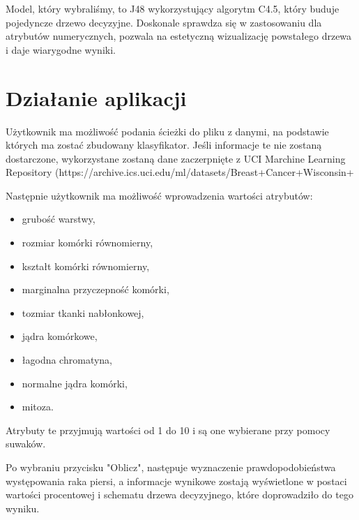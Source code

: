 \documentclass{article}
\begin{document}
Model, który wybraliśmy, to J48 wykorzystujący algorytm C4.5, który buduje pojedyncze drzewo decyzyjne. Doskonale sprawdza się w zastosowaniu dla atrybutów numerycznych, pozwala na estetyczną wizualizację powstałego drzewa i daje wiarygodne wyniki.

\section{Działanie aplikacji}

Użytkownik ma możliwość podania ścieżki do pliku z danymi, na podstawie których ma zostać zbudowany klasyfikator. Jeśli informacje te nie zostaną dostarczone, wykorzystane zostaną dane zaczerpnięte z UCI Marchine Learning Repository (https://archive.ics.uci.edu/ml/datasets/Breast+Cancer+Wisconsin+%

Następnie użytkownik ma możliwość wprowadzenia wartości atrybutów:
\begin{itemize}
\item grubość warstwy,
\item rozmiar komórki równomierny,
\item kształt komórki równomierny,
\item marginalna przyczepność komórki,
\item tozmiar tkanki nabłonkowej,
\item jądra komórkowe,
\item łagodna chromatyna,
\item normalne jądra komórki,
\item mitoza.
\end{itemize}
Atrybuty te przyjmują wartości od 1 do 10 i są one wybierane przy pomocy suwaków.

Po wybraniu przycisku "Oblicz", następuje wyznaczenie prawdopodobieństwa występowania raka piersi, a informacje wynikowe zostają wyświetlone w postaci wartości procentowej i schematu drzewa decyzyjnego, które doprowadziło do tego wyniku.
\end{document}
